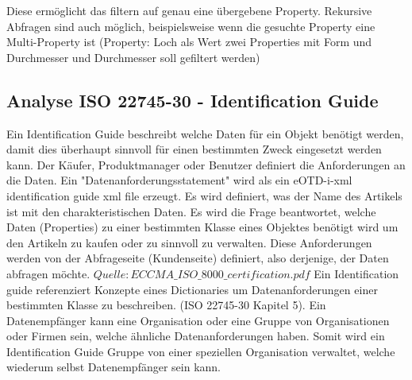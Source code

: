 Diese ermöglicht das filtern auf genau eine übergebene Property. Rekursive Abfragen sind auch möglich, beispielsweise wenn die gesuchte Property eine Multi-Property ist (Property: Loch als Wert zwei Properties mit Form und Durchmesser und Durchmesser soll gefiltert werden)

\subsection{Analyse ISO 22745-30 - Identification Guide}

Ein Identification Guide beschreibt welche Daten für ein Objekt benötigt werden, damit dies überhaupt sinnvoll für einen bestimmten Zweck eingesetzt werden kann. Der Käufer, Produktmanager oder Benutzer definiert die Anforderungen an die Daten. Ein "Datenanforderungsstatement" wird als ein eOTD-i-xml identification guide xml file erzeugt. Es wird definiert, was der Name des Artikels ist mit den charakteristischen Daten. Es wird die Frage beantwortet, welche Daten (Properties) zu einer bestimmten Klasse eines Objektes benötigt wird um den Artikeln zu kaufen oder zu sinnvoll zu verwalten. Diese Anforderungen werden von der Abfrageseite (Kundenseite) definiert, also derjenige, der Daten abfragen möchte. \(Quelle: ECCMA\_ISO\_8000\_certification.pdf\)
Ein Identification guide referenziert Konzepte eines Dictionaries um Datenanforderungen einer bestimmten Klasse zu beschreiben. (ISO 22745-30 Kapitel 5). 
Ein Datenempfänger kann eine Organisation oder eine Gruppe von Organisationen oder Firmen sein, welche ähnliche Datenanforderungen haben. Somit wird ein Identification Guide Gruppe von einer speziellen Organisation verwaltet, welche wiederum selbst Datenempfänger sein kann.  

